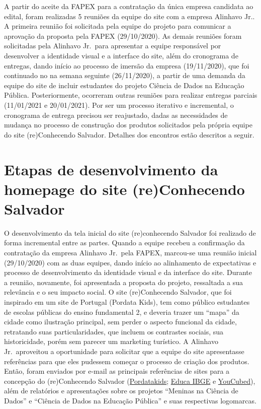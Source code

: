 \documentclass[
]{book}
\begin{document}
A partir do aceite da FAPEX para a contratação da única empresa candidata ao edital, foram realizadas 5 reuniões da equipe do site com a empresa Alinhavo Jr.. A primeira reunião foi solicitada pela equipe do projeto para comunicar a aprovação da proposta pela FAPEX (29/10/2020). As demais reuniões foram solicitadas pela Alinhavo Jr.~para apresentar a equipe responsável por desenvolver a identidade visual e a interface do site, além do cronograma de entregas, dando início ao processo de imersão da empresa (19/11/2020), que foi continuado no na semana seguinte (26/11/2020), a partir de uma demanda da equipe do site de incluir estudantes do projeto Ciência de Dados na Educação Pública.
Posteriormente, ocorreram outras reuniões para realizar entregas parciais (11/01/2021 e 20/01/2021). Por ser um processo iterativo e incremental, o cronograma de entrega precisou ser reajustado, dadas as necessidades de mudança no processo de construção dos produtos solicitados pela própria equipe do site (re)Conhecendo Salvador. Detalhes dos encontros estão descritos a seguir.

\hypertarget{etapas-de-desenvolvimento-da-homepage-do-site-reconhecendo-salvador}{%
\section{Etapas de desenvolvimento da homepage do site (re)Conhecendo Salvador}\label{etapas-de-desenvolvimento-da-homepage-do-site-reconhecendo-salvador}}

O desenvolvimento da tela inicial do site (re)conhecendo Salvador foi
realizado de forma incremental entre as partes. Quando a equipe recebeu
a confirmação da contratação da empresa Alinhavo Jr.~pela FAPEX,
marcou-se uma reunião inicial (29/10/2020) com as duas equipes, dando
início ao alinhamento de expectativas e processo de desenvolvimento da
identidade visual e da interface do site.
Durante a reunião, novamente, foi apresentada a proposta do projeto, ressaltada a sua relevância e o seu impacto social. O site (re)Conhecendo Salvador, que foi inspirado em um site de Portugal (Pordata Kids), tem como público estudantes de escolas públicas do ensino fundamental 2, e deveria trazer um ``mapa'' da cidade como ilustração principal, sem perder o aspecto funcional da cidade, retratando suas particularidades, que incluem os contrastes sociais, sua historicidade, porém sem parecer um marketing turístico. A Alinhavo Jr.~aproveitou a oportunidade para solicitar que a equipe do site apresentasse referências para que eles pudessem começar o processo de criação dos produtos. Então, foram enviados por e-mail as principais referências de sites para a concepção do (re)Conhecendo Salvador (\href{https://www.pordatakids.pt/}{Pordatakids}; \href{https://educa.ibge.gov.br/}{Educa IBGE} e \href{https://www.youcubed.org/pt-br/}{YouCubed}), além de relatórios e apresentações sobre os projetos ``Meninas na Ciência de Dados'' e ``Ciência de Dados na Educação Pública'' e suas respectivas logomarcas.
\end{document}
